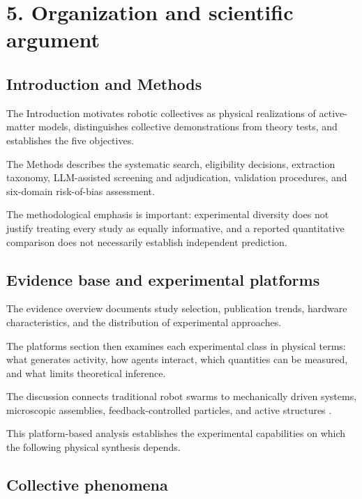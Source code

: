 \section*{5. Organization and scientific argument}

\subsection*{Introduction and Methods}

The Introduction motivates robotic collectives
as physical realizations of active-matter models,
distinguishes collective demonstrations from
theory tests, and establishes the five objectives.

The Methods describes the systematic search,
eligibility decisions, extraction taxonomy,
LLM-assisted screening and adjudication,
validation procedures, and six-domain
risk-of-bias assessment.

The methodological emphasis is important:
experimental diversity does not justify
treating every study as equally informative,
and a reported quantitative comparison
does not necessarily establish
independent prediction.

\subsection*{Evidence base and experimental platforms}

The evidence overview documents study selection,
publication trends, hardware characteristics,
and the distribution of experimental approaches.

The platforms section then examines each
experimental class in physical terms:
what generates activity, how agents interact,
which quantities can be measured, and
what limits theoretical inference.

The discussion connects traditional robot
swarms to mechanically driven systems,
microscopic assemblies, feedback-controlled
particles, and active structures
\cite{Rubenstein2014programmableselfas,Li2019particleroboticsba,Savoie2019arobotmadeofrobo,Sun2021swarmingmicrodrople,Yang2022emergentmicroroboti}.

This platform-based analysis establishes
the experimental capabilities on which
the following physical synthesis depends.

\subsection*{Collective phenomena}

